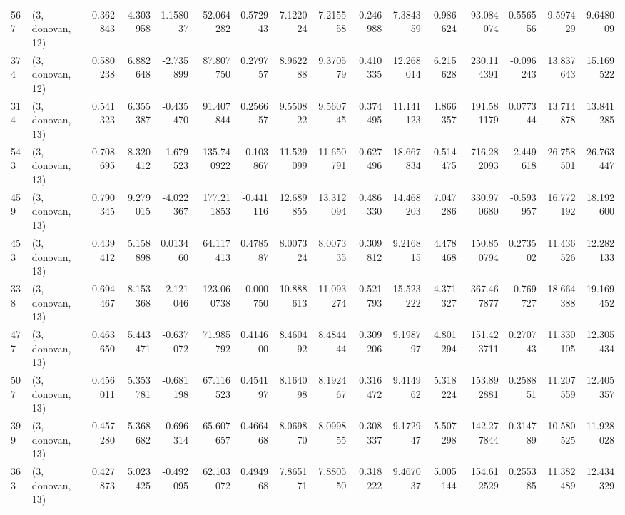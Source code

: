 \begin{tabular}{llrrrrrrrrrrrrrr}
567 &  (3, donovan, 12) &   0.362843 &   4.303958 &   1.158037 &    52.064282 &   0.572943 &   7.122024 &   7.215558 &  0.246988 &   7.384359 &   0.986624 &    93.084074 &  0.556556 &   9.597429 &   9.648009 \\
374 &  (3, donovan, 12) &   0.580238 &   6.882648 &  -2.735899 &    87.807750 &   0.279757 &   8.962288 &   9.370579 &  0.410335 &  12.268014 &   6.215628 &   230.114391 & -0.096243 &  13.837643 &  15.169522 \\
314 &  (3, donovan, 13) &   0.541323 &   6.355387 &  -0.435470 &    91.407844 &   0.256657 &   9.550822 &   9.560745 &  0.374495 &  11.141123 &   1.866357 &   191.581179 &  0.077344 &  13.714878 &  13.841285 \\
543 &  (3, donovan, 13) &   0.708695 &   8.320412 &  -1.679523 &   135.740922 &  -0.103867 &  11.529099 &  11.650791 &  0.627496 &  18.667834 &   0.514475 &   716.282093 & -2.449618 &  26.758501 &  26.763447 \\
459 &  (3, donovan, 13) &   0.790345 &   9.279015 &  -4.022367 &   177.211853 &  -0.441116 &  12.689855 &  13.312094 &  0.486330 &  14.468203 &   7.047286 &   330.970680 & -0.593957 &  16.772192 &  18.192600 \\
453 &  (3, donovan, 13) &   0.439412 &   5.158898 &   0.013460 &    64.117413 &   0.478587 &   8.007324 &   8.007335 &  0.309812 &   9.216815 &   4.478468 &   150.850794 &  0.273502 &  11.436526 &  12.282133 \\
338 &  (3, donovan, 13) &   0.694467 &   8.153368 &  -2.121046 &   123.060738 &  -0.000750 &  10.888613 &  11.093274 &  0.521793 &  15.523222 &   4.371327 &   367.467877 & -0.769727 &  18.664388 &  19.169452 \\
477 &  (3, donovan, 13) &   0.463650 &   5.443471 &  -0.637072 &    71.985792 &   0.414600 &   8.460492 &   8.484444 &  0.309206 &   9.198797 &   4.801294 &   151.423711 &  0.270743 &  11.330105 &  12.305434 \\
507 &  (3, donovan, 13) &   0.456011 &   5.353781 &  -0.681198 &    67.116523 &   0.454197 &   8.164098 &   8.192467 &  0.316472 &   9.414962 &   5.318224 &   153.892881 &  0.258851 &  11.207559 &  12.405357 \\
399 &  (3, donovan, 13) &   0.457280 &   5.368682 &  -0.696314 &    65.607657 &   0.466468 &   8.069870 &   8.099855 &  0.308337 &   9.172947 &   5.507298 &   142.277844 &  0.314789 &  10.580525 &  11.928028 \\
363 &  (3, donovan, 13) &   0.427873 &   5.023425 &  -0.492095 &    62.103072 &   0.494968 &   7.865171 &   7.880550 &  0.318222 &   9.467037 &   5.005144 &   154.612529 &  0.255385 &  11.382489 &  12.434329 \\

\end{tabular}
